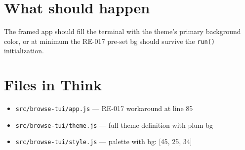 \section{What should happen}\label{record-410-what-should-happen}

The framed app should fill the terminal with the theme's primary background color, or at minimum the RE-017 pre-set bg should survive the \texttt{r\allowbreak{}u\allowbreak{}n\allowbreak{}(\allowbreak{})} initialization.

\section{Files in Think}\label{record-410-files-in-think}

\begin{itemize}
\tightlist
\item
  \texttt{s\allowbreak{}r\allowbreak{}c\allowbreak{}/\allowbreak{}b\allowbreak{}r\allowbreak{}o\allowbreak{}w\allowbreak{}s\allowbreak{}e\allowbreak{}-\allowbreak{}t\allowbreak{}u\allowbreak{}i\allowbreak{}/\allowbreak{}a\allowbreak{}p\allowbreak{}p\allowbreak{}.\allowbreak{}j\allowbreak{}s} --- RE-017 workaround at line 85
\item
  \texttt{s\allowbreak{}r\allowbreak{}c\allowbreak{}/\allowbreak{}b\allowbreak{}r\allowbreak{}o\allowbreak{}w\allowbreak{}s\allowbreak{}e\allowbreak{}-\allowbreak{}t\allowbreak{}u\allowbreak{}i\allowbreak{}/\allowbreak{}t\allowbreak{}h\allowbreak{}e\allowbreak{}m\allowbreak{}e\allowbreak{}.\allowbreak{}j\allowbreak{}s} --- full theme definition with plum bg
\item
  \texttt{s\allowbreak{}r\allowbreak{}c\allowbreak{}/\allowbreak{}b\allowbreak{}r\allowbreak{}o\allowbreak{}w\allowbreak{}s\allowbreak{}e\allowbreak{}-\allowbreak{}t\allowbreak{}u\allowbreak{}i\allowbreak{}/\allowbreak{}s\allowbreak{}t\allowbreak{}y\allowbreak{}l\allowbreak{}e\allowbreak{}.\allowbreak{}j\allowbreak{}s} --- palette with bg: {[}45, 25, 34{]}
\end{itemize}

